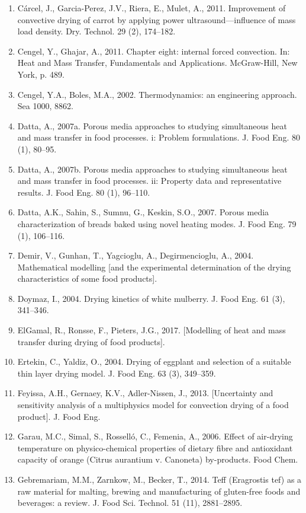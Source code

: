\documentclass[11pt,a4paper]{ctexart}
\begin{document}
\begin{enumerate}
\item Cárcel, J., Garcia-Perez, J.V., Riera, E., Mulet, A., 2011. Improvement of convective drying of carrot by applying power ultrasound—influence of mass load density. Dry. Technol. 29 (2), 174--182.
\item Cengel, Y., Ghajar, A., 2011. Chapter eight: internal forced convection. In: Heat and Mass Transfer, Fundamentals and Applications. McGraw-Hill, New York, p. 489.
\item Cengel, Y.A., Boles, M.A., 2002. Thermodynamics: an engineering approach. Sea 1000, 8862.
\item Datta, A., 2007a. Porous media approaches to studying simultaneous heat and mass transfer in food processes. i: Problem formulations. J. Food Eng. 80 (1), 80--95.
\item Datta, A., 2007b. Porous media approaches to studying simultaneous heat and mass transfer in food processes. ii: Property data and representative results. J. Food Eng. 80 (1), 96--110.
\item Datta, A.K., Sahin, S., Sumnu, G., Keskin, S.O., 2007. Porous media characterization of breads baked using novel heating modes. J. Food Eng. 79 (1), 106--116.
\item Demir, V., Gunhan, T., Yagcioglu, A., Degirmencioglu, A., 2004. Mathematical modelling [and the experimental determination of the drying characteristics of some food products].
\item Doymaz, I., 2004. Drying kinetics of white mulberry. J. Food Eng. 61 (3), 341--346.
\item ElGamal, R., Ronsse, F., Pieters, J.G., 2017. [Modelling of heat and mass transfer during drying of food products].
\item Ertekin, C., Yaldiz, O., 2004. Drying of eggplant and selection of a suitable thin layer drying model. J. Food Eng. 63 (3), 349--359.
\item Feyissa, A.H., Gernaey, K.V., Adler-Nissen, J., 2013. [Uncertainty and sensitivity analysis of a multiphysics model for convection drying of a food product]. J. Food Eng.
\item Garau, M.C., Simal, S., Rosselló, C., Femenia, A., 2006. Effect of air-drying temperature on physico-chemical properties of dietary fibre and antioxidant capacity of orange (Citrus aurantium v. Canoneta) by-products. Food Chem.
\item Gebremariam, M.M., Zarnkow, M., Becker, T., 2014. Teff (Eragrostis tef) as a raw material for malting, brewing and manufacturing of gluten-free foods and beverages: a review. J. Food Sci. Technol. 51 (11), 2881--2895.

\end{enumerate}
\end{document}
